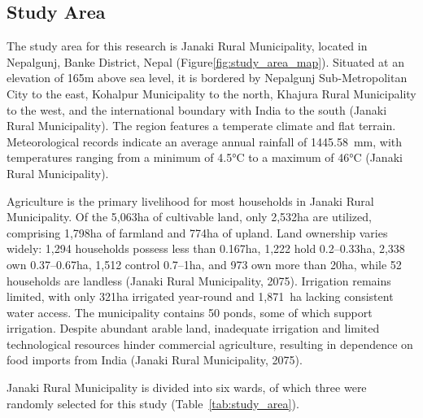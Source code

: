 \subsection{Study Area}



The study area for this research is Janaki Rural Municipality, located in Nepalgunj, Banke District, Nepal (Figure\ref{fig:study_area_map}). Situated at an elevation of 165m above sea level, it is bordered by Nepalgunj Sub-Metropolitan City to the east, Kohalpur Municipality to the north, Khajura Rural Municipality to the west, and the international boundary with India to the south (Janaki Rural Municipality). The region features a temperate climate and flat terrain. Meteorological records indicate an average annual rainfall of 1445.58~mm, with temperatures ranging from a minimum of 4.5°C to a maximum of 46°C (Janaki Rural Municipality).

Agriculture is the primary livelihood for most households in Janaki Rural Municipality. Of the 5,063ha of cultivable land, only 2,532ha are utilized, comprising 1,798ha of farmland and 774ha of upland. Land ownership varies widely: 1,294 households possess less than 0.167ha, 1,222 hold 0.2--0.33ha, 2,338 own 0.37--0.67ha, 1,512 control 0.7--1ha, and 973 own more than 20ha, while 52 households are landless (Janaki Rural Municipality, 2075). Irrigation remains limited, with only 321ha irrigated year-round and 1,871~ha lacking consistent water access. The municipality contains 50 ponds, some of which support irrigation. Despite abundant arable land, inadequate irrigation and limited technological resources hinder commercial agriculture, resulting in dependence on food imports from India (Janaki Rural Municipality, 2075).
    
Janaki Rural Municipality is divided into six wards, of which three were randomly selected for this study (Table~\ref{tab:study_area}). 

\begin{table}[h]
\centering
\caption{Study Area with elevation and coordinates}
\label{tab:study_area}
\end{table}

